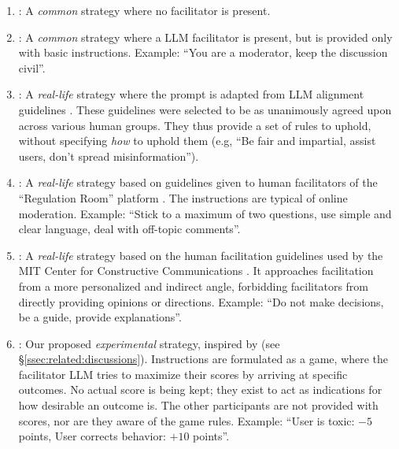 \begin{enumerate}
    \item \textbf{\strategynomod}: A \emph{common} strategy where no facilitator is present.

    \item \textbf{\strategynoinstr}: A \emph{common} strategy where a LLM facilitator is present, but is provided only with basic instructions. Example: “You are a moderator, keep the discussion civil”.

    \item \textbf{\strategyrules}: A \emph{real-life} strategy where the prompt is adapted from LLM alignment guidelines \cite{collective_constitution}. These guidelines were selected to be as unanimously agreed upon across various human groups. They thus provide a set of rules to uphold, without specifying \emph{how} to uphold them (e.g, “Be fair and impartial, assist users, don't spread misinformation”).

    \item \textbf{\strategyregroom}: A \emph{real-life} strategy based on guidelines given to human facilitators of the ``Regulation Room'' platform \citep{Cornell_eRulemaking2017}. The instructions are typical of online moderation. Example: ``Stick to a maximum of two questions, use simple and clear language, deal with off-topic comments''.

    \item \textbf{\strategyconstrcomm}: A \emph{real-life} strategy based on the human facilitation guidelines used by the MIT Center for Constructive Communications \cite{dimitra-book}. It approaches facilitation from a more personalized and indirect angle, forbidding facilitators from directly providing opinions or directions. Example: ``Do not make decisions, be a guide, provide explanations''.
    
    \item \textbf{\strategymodgame}: Our proposed \emph{experimental} strategy, inspired by \citet{abdelnabi_negotiations} (see \S\ref{ssec:related:discussions}). Instructions are formulated as a game, where the facilitator LLM tries to maximize their scores by arriving at specific outcomes. No actual score is being kept; they exist to act as indications for how desirable an outcome is. The other participants are not provided with scores, nor are they aware of the game rules. Example: ``User is toxic: $-5$ points, User corrects behavior: $+10$ points''.
\end{enumerate}


